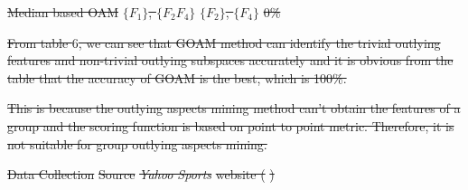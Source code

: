 \documentclass[
 size=14pt,
 paper=smartboard,  %
 mode=present, 		%
 display=slides, 	%
 style=tuliplab,  	%
 pauseslide,
 fleqn,leqno]{powerdot}
\providecommand{\DIFdeltex}[1]{{\protect\color{red}\sout{#1}}}                      %
\providecommand{\DIFdelbegin}{} %
\providecommand{\DIFdelend}{} %
\providecommand{\DIFdelFL}[1]{\DIFdel{#1}} %
\providecommand{\DIFdelbeginFL}{} %
\providecommand{\DIFdel}[1]{\texorpdfstring{\DIFdeltex{#1}}{}} %
\newcommand{\DIFscaledelfig}{0.5}
\newlength{\DIFdelgraphicswidth} %
\newlength{\DIFdelgraphicsheight} %
\newcommand{\DIFdelincludegraphics}[2][]{%
\sbox{\DIFdelgraphicsbox}{\DIFOincludegraphics[#1]{#2}}%
\settoboxwidth{\DIFdelgraphicswidth}{\DIFdelgraphicsbox} %
\settoboxtotalheight{\DIFdelgraphicsheight}{\DIFdelgraphicsbox} %
\scalebox{\DIFscaledelfig}{%
\parbox[b]{\DIFdelgraphicswidth}{\usebox{\DIFdelgraphicsbox}\\[-\baselineskip] \rule{\DIFdelgraphicswidth}{0em}}\llap{\resizebox{\DIFdelgraphicswidth}{\DIFdelgraphicsheight}{%
\setlength{\unitlength}{\DIFdelgraphicswidth}%
\begin{picture}(1,1)%
\thicklines\linethickness{2pt} %
{\color[rgb]{1,0,0}\put(0,0){\framebox(1,1){}}}%
{\color[rgb]{1,0,0}\put(0,0){\line( 1,1){1}}}%
{\color[rgb]{1,0,0}\put(0,1){\line(1,-1){1}}}%
\end{picture}%
}\hspace*{3pt}}} %
} %
\DeclareRobustCommand{\DIFdelbegin}{\DIFOdelbegin \let\includegraphics\DIFdelincludegraphics} %
\DeclareRobustCommand{\DIFdelend}{\DIFOaddend \let\includegraphics\DIFOincludegraphics} %
\DeclareRobustCommand{\DIFdelbeginFL}{\DIFOdelbeginFL \let\includegraphics\DIFdelincludegraphics} %
\begin{document}
\DIFdelbeginFL \DIFdelFL{Median based OAM }%
\DIFdelFL{$\{F_1\}$, $\{F_2F_4\}$   }%
\DIFdelFL{$\{F_2\}$, $\{F_4\}$    }%
\DIFdelFL{0\% }%

\DIFdel{From table $6$,
we can see that GOAM method can identify the trivial outlying features
and non-trivial outlying subspaces accurately and
it is obvious from the table that the accuracy of GOAM is the best,
which is 100\%.
}%

\DIFdel{This is because the outlying aspects mining method
can't obtain the features of a group and the scoring function
is based on point to point metric.
Therefore,
it is not suitable for group outlying aspects mining.
}%

\DIFdelend %


\DIFdelbegin %
\DIFdel{Data Collection
}%
\DIFdel{Source}%
\emph{\DIFdel{Yahoo Sports}} %
\DIFdel{website (}%
\DIFdel{)
}\DIFdelend %
\end{document}
